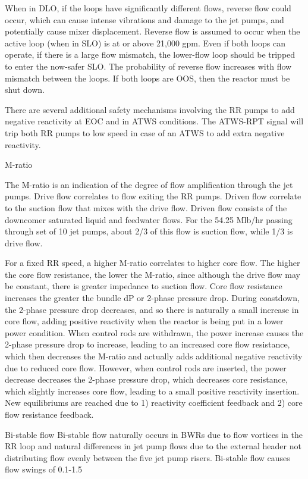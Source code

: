 \documentclass[10pt]{article}
\begin{document}
When in DLO, if the loops have significantly different flows, reverse flow could occur, which can cause intense vibrations and damage to the jet pumps, and potentially cause mixer displacement. Reverse flow is assumed to occur when the active loop (when in SLO) is at or above 21,000 gpm. Even if both loops can operate, if there is a large flow mismatch, the lower-flow loop should be tripped to enter the now-safer SLO. The probability of reverse flow increases with flow mismatch between the loops. If both loops are OOS, then the reactor must be shut down. 

There are several additional safety mechanisms involving the RR pumps to add negative reactivity at EOC and in ATWS conditions. The ATWS-RPT signal will trip both RR pumps to low speed in case of an ATWS to add extra negative reactivity. 

M-ratio


The M-ratio is an indication of the degree of flow amplification through the jet pumps. Drive flow correlates to flow exiting the RR pumps. Driven flow correlate to the suction flow that mixes with the drive flow. Driven flow consists of the downcomer saturated liquid and feedwater flows. For the 54.25 Mlb/hr passing through set of 10 jet pumps, about 2/3 of this flow is suction flow, while 1/3 is drive flow.  

For a fixed RR speed, a higher M-ratio correlates to higher core flow. The higher the core flow resistance, the lower the M-ratio, since although the drive flow may be constant, there is greater impedance to suction flow. Core flow resistance increases the greater the bundle dP or 2-phase pressure drop. During coastdown, the 2-phase pressure drop decreases, and so there is naturally a small increase in core flow, adding positive reactivity when the reactor is being put in a lower power condition. When control rods are withdrawn, the power increase causes the 2-phase pressure drop to increase, leading to an increased core flow resistance, which then decreases the M-ratio and actually adds additional negative reactivity due to reduced core flow. However, when control rods are inserted, the power decrease decreases the 2-phase pressure drop, which decreases core resistance, which slightly increases core flow, leading to a small positive reactivity insertion. New equilibriums are reached due to 1) reactivity coefficient feedback and 2) core flow resistance feedback.

Bi-stable flow
Bi-stable flow naturally occurs in BWRs due to flow vortices in the RR loop and natural differences in jet pump flows due to the external header not distributing flow evenly between the five jet pump risers. Bi-stable flow causes flow swings of 0.1-1.5%
\end{document}
